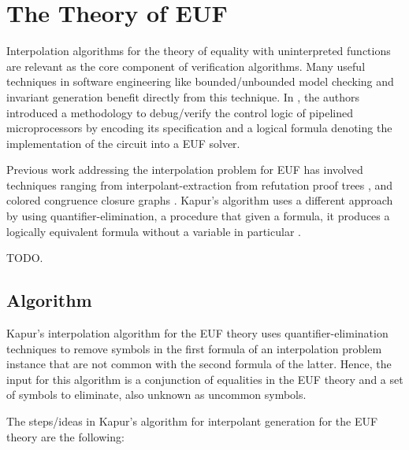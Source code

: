 \chapter{The Theory of EUF}

Interpolation algorithms for the theory of equality 
with uninterpreted functions are relevant as the core 
component of verification algorithms. Many useful techniques 
in software engineering like bounded/unbounded model 
checking and invariant generation benefit directly from 
this technique. In \cite{10.1007/3-540-58179-0_44}, the 
authors introduced a methodology to debug/verify the 
control logic of pipelined microprocessors by encoding 
its specification and a logical formula denoting the 
implementation of the circuit into a EUF solver.

Previous work addressing the interpolation problem for 
EUF has involved techniques ranging from
interpolant-extraction from refutation proof 
trees \cite{10.1007/978-3-540-24730-2_2, mcmillan2011interpolants, 
10.1007/978-3-642-31612-8_24}, and colored congruence closure
graphs \cite{10.1007/978-3-642-00768-2_34}. Kapur's algorithm 
uses a different approach by using
quantifier-elimination, a procedure that given a formula, 
it produces a logically equivalent formula
 without a variable in particular \cite{DBLP:books/daglib/0076838}.

 TODO.

\section{Algorithm}

Kapur's interpolation algorithm for the EUF theory uses quantifier-elimination
techniques to remove symbols in the first formula of an interpolation problem instance
that are not common with the second formula of the latter. 
Hence, the input for this algorithm is a conjunction of equalities in the
EUF theory and a set of symbols to eliminate, also unknown as uncommon symbols.

The steps/ideas in Kapur's algorithm for interpolant generation for the EUF theory
are the following:

